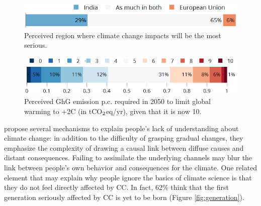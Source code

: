 \documentclass[english,5p,authoryear]{elsarticle}
\begin{document}
\begin{figure}[t]
\centering
\includegraphics[width=\columnwidth]{Images/CC_region_nolegend.png}
\caption{Perceived region where climate change impacts will be the most serious.}
\label{fig:region}
\end{figure}

\begin{figure}[t]
\centering
\includegraphics[width=\columnwidth]{Images/CC_target_emission_nolegend.png}
\caption{Perceived GhG emission p.c. required in 2050 to limit global warming to +2\textdegree{}C (in tCO$_\textnormal{2}$eq/yr), given that it is now 10.}
\label{fig:target_emission}
\end{figure}

\citet{millner_beliefs_2016} propose several mechanisms to explain people's lack of understanding about climate change: in addition to the difficulty of grasping gradual changes, they emphasize the complexity of drawing a causal link between diffuse causes and distant consequences. Failing to assimilate the underlying channels may blur the link between people's own behavior and consequences for the climate. One related element that may explain why people ignore the basics of climate science is that they do not feel directly affected by CC. In fact, 62\% think that the first generation seriously affected by CC is yet to be born (Figure \ref{fig:generation}). %
\end{document}
